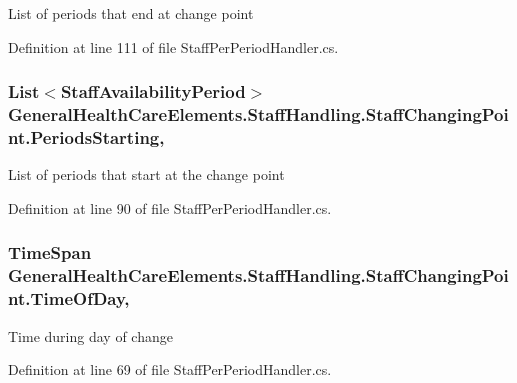 List of periods that end at change point 



Definition at line 111 of file Staff\+Per\+Period\+Handler.\+cs.

\subsubsection[{\texorpdfstring{Periods\+Starting}{PeriodsStarting}}]{\setlength{\rightskip}{0pt plus 5cm}List$<${\bf Staff\+Availability\+Period}$>$ General\+Health\+Care\+Elements.\+Staff\+Handling.\+Staff\+Changing\+Point.\+Periods\+Starting\hspace{0.3cm}{\ttfamily [get]}, {\ttfamily [set]}}\hypertarget{class_general_health_care_elements_1_1_staff_handling_1_1_staff_changing_point_acc95ce624cc8b1933d607229b33bcb36}{}\label{class_general_health_care_elements_1_1_staff_handling_1_1_staff_changing_point_acc95ce624cc8b1933d607229b33bcb36}


List of periods that start at the change point 



Definition at line 90 of file Staff\+Per\+Period\+Handler.\+cs.

\subsubsection[{\texorpdfstring{Time\+Of\+Day}{TimeOfDay}}]{\setlength{\rightskip}{0pt plus 5cm}Time\+Span General\+Health\+Care\+Elements.\+Staff\+Handling.\+Staff\+Changing\+Point.\+Time\+Of\+Day\hspace{0.3cm}{\ttfamily [get]}, {\ttfamily [set]}}\hypertarget{class_general_health_care_elements_1_1_staff_handling_1_1_staff_changing_point_ae1e52e8a83754b946679b903b048ed95}{}\label{class_general_health_care_elements_1_1_staff_handling_1_1_staff_changing_point_ae1e52e8a83754b946679b903b048ed95}


Time during day of change 



Definition at line 69 of file Staff\+Per\+Period\+Handler.\+cs.

